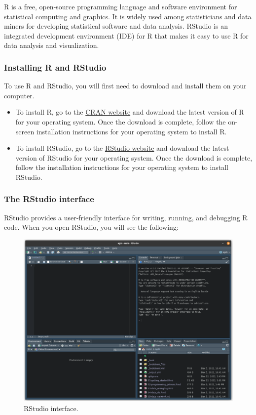 \documentclass[
]{book}
\begin{document}
R is a free, open-source programming language and software environment for statistical computing and graphics. It is widely used among statisticians and data miners for developing statistical software and data analysis. RStudio is an integrated development environment (IDE) for R that makes it easy to use R for data analysis and visualization.

\hypertarget{installing-r-and-rstudio}{%
\subsubsection{Installing R and RStudio}\label{installing-r-and-rstudio}}

To use R and RStudio, you will first need to download and install them on your computer.

\begin{itemize}
\item
  To install R, go to the \href{https://cran.r-project.org/}{CRAN website} and download the latest version of R for your operating system. Once the download is complete, follow the on-screen installation instructions for your operating system to install R.
\item
  To install RStudio, go to the \href{https://posit.co/download/rstudio-desktop/}{RStudio website} and download the latest version of RStudio for your operating system. Once the download is complete, follow the installation instructions for your operating system to install RStudio.
\end{itemize}

\hypertarget{the-rstudio-interface}{%
\subsubsection{The RStudio interface}\label{the-rstudio-interface}}

RStudio provides a user-friendly interface for writing, running, and debugging R code. When you open RStudio, you will see the following:

\begin{figure}
\centering
\includegraphics{figures/RStudio_interface_screenshot.png}
\caption{RStudio interface.}
\end{figure}
\end{document}

